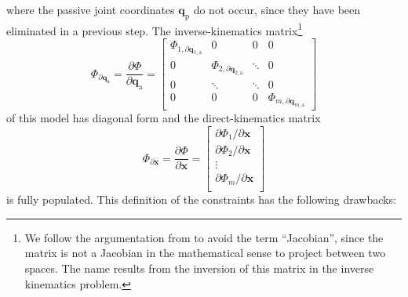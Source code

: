 \documentclass[robotics,article,submit,moreauthors,pdftex]{Definitions/mdpi}
\newcommand{\bm}[1]{\boldsymbol{#1}}
\let\Phi\varPhi
\begin{document}
%
where the passive joint coordinates $\bm{q}_{\mathrm{p}}$ do not occur, since they have been eliminated in a previous step.
The inverse-kinematics matrix\footnote{We follow the argumentation from \cite{Gogu2008} to avoid the term ``Jacobian'', since the matrix is not a Jacobian in the mathematical sense to project between two spaces. The name results from the inversion of this matrix in the inverse kinematics problem.}
%
\begin{equation}
\bm{\Phi}_{\partial \bm{q}_{\mathrm{a}}}
=
\frac{\partial \bm{\Phi}}{\partial \bm{q}_{\mathrm{a}}}
=
\begin{bmatrix}
\Phi_{1,\partial \bm{q}_{1,\mathrm{a}}}  & 0 & 0 & 0\\
0 & \Phi_{2,\partial \bm{q}_{2,\mathrm{a}}} & \ddots & 0  \\
0 & \ddots & \ddots & 0  \\
0 & 0 & 0 & \Phi_{m,\partial \bm{q}_{m,\mathrm{a}}}
\end{bmatrix}
\label{equ:PKM_phi_grad_q}
\end{equation}  
%
of this model has diagonal form and the direct-kinematics matrix
%
\begin{equation}
\bm{\Phi}_{\partial \bm{x}}
=
\frac{\partial \bm{\Phi}}{\partial \bm{x}}
=
\begin{bmatrix}
\partial \Phi_1/\partial \bm{x}\\
\partial \Phi_2/\partial \bm{x}\\
\vdots \\
\partial \Phi_m/\partial \bm{x}\\
\end{bmatrix}
\label{equ:PKM_phi_grad_x}
\end{equation}
%
is fully populated.
This definition of the constraints has the following drawbacks:
\end{document}
